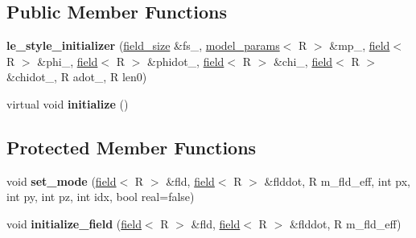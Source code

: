 \subsection*{Public Member Functions}
\begin{DoxyCompactItemize}
\item 
\hypertarget{classle__style__initializer_a7a21af6b2b39ec0800c7336b8fa47ece}{
{\bfseries le\_\-style\_\-initializer} (\hyperlink{structfield__size}{field\_\-size} \&fs\_\-, \hyperlink{structmodel__params}{model\_\-params}$<$ R $>$ \&mp\_\-, \hyperlink{classfield}{field}$<$ R $>$ \&phi\_\-, \hyperlink{classfield}{field}$<$ R $>$ \&phidot\_\-, \hyperlink{classfield}{field}$<$ R $>$ \&chi\_\-, \hyperlink{classfield}{field}$<$ R $>$ \&chidot\_\-, R adot\_\-, R len0)}
\label{classle__style__initializer_a7a21af6b2b39ec0800c7336b8fa47ece}

\item 
\hypertarget{classle__style__initializer_ac5ca8b27383d7b35170f6d5bf6e3d96f}{
virtual void {\bfseries initialize} ()}
\label{classle__style__initializer_ac5ca8b27383d7b35170f6d5bf6e3d96f}

\end{DoxyCompactItemize}
\subsection*{Protected Member Functions}
\begin{DoxyCompactItemize}
\item 
\hypertarget{classle__style__initializer_a7b95cb916de69483725ea553871a16fb}{
void {\bfseries set\_\-mode} (\hyperlink{classfield}{field}$<$ R $>$ \&fld, \hyperlink{classfield}{field}$<$ R $>$ \&flddot, R m\_\-fld\_\-eff, int px, int py, int pz, int idx, bool real=false)}
\label{classle__style__initializer_a7b95cb916de69483725ea553871a16fb}

\item 
\hypertarget{classle__style__initializer_a86624b36b749497e52835f385ecd568d}{
void {\bfseries initialize\_\-field} (\hyperlink{classfield}{field}$<$ R $>$ \&fld, \hyperlink{classfield}{field}$<$ R $>$ \&flddot, R m\_\-fld\_\-eff)}
\label{classle__style__initializer_a86624b36b749497e52835f385ecd568d}

\end{DoxyCompactItemize}
